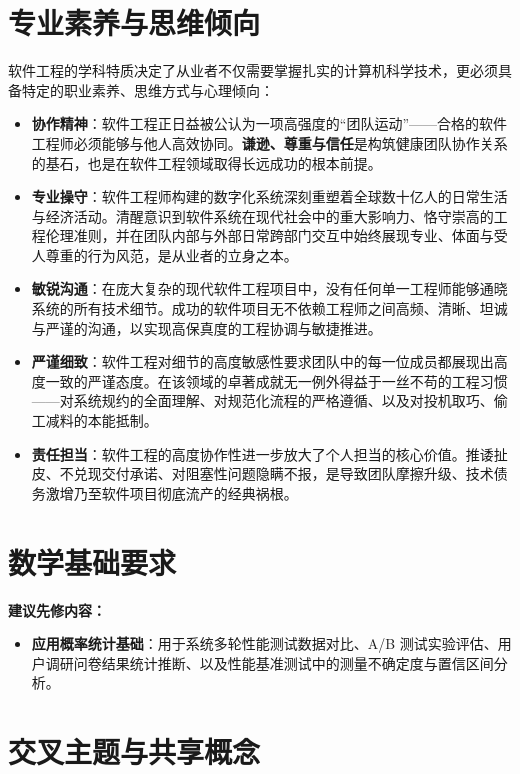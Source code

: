 \section{专业素养与思维倾向}

软件工程的学科特质决定了从业者不仅需要掌握扎实的计算机科学技术，更必须具备特定的职业素养、思维方式与心理倾向：

\begin{itemize}
    \item \textbf{协作精神}：软件工程正日益被公认为一项高强度的“团队运动”——合格的软件工程师必须能够与他人高效协同。\textbf{谦逊、尊重与信任}是构筑健康团队协作关系的基石，也是在软件工程领域取得长远成功的根本前提。
    \item \textbf{专业操守}：软件工程师构建的数字化系统深刻重塑着全球数十亿人的日常生活与经济活动。清醒意识到软件系统在现代社会中的重大影响力、恪守崇高的工程伦理准则，并在团队内部与外部日常跨部门交互中始终展现专业、体面与受人尊重的行为风范，是从业者的立身之本。
    \item \textbf{敏锐沟通}：在庞大复杂的现代软件工程项目中，没有任何单一工程师能够通晓系统的所有技术细节。成功的软件项目无不依赖工程师之间高频、清晰、坦诚与严谨的沟通，以实现高保真度的工程协调与敏捷推进。
    \item \textbf{严谨细致}：软件工程对细节的高度敏感性要求团队中的每一位成员都展现出高度一致的严谨态度。在该领域的卓著成就无一例外得益于一丝不苟的工程习惯——对系统规约的全面理解、对规范化流程的严格遵循、以及对投机取巧、偷工减料的本能抵制。
    \item \textbf{责任担当}：软件工程的高度协作性进一步放大了个人担当的核心价值。推诿扯皮、不兑现交付承诺、对阻塞性问题隐瞒不报，是导致团队摩擦升级、技术债务激增乃至软件项目彻底流产的经典祸根。
\end{itemize}

\section{数学基础要求}

\textbf{建议先修内容：}
\begin{itemize}
    \item \textbf{应用概率统计基础}：用于系统多轮性能测试数据对比、A/B 测试实验评估、用户调研问卷结果统计推断、以及性能基准测试中的测量不确定度与置信区间分析。
\end{itemize}

\section{交叉主题与共享概念}

